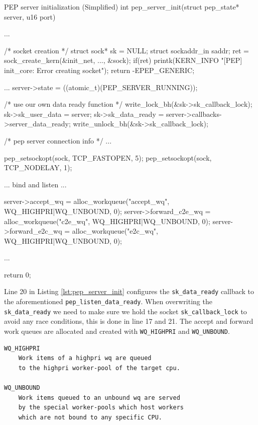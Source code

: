 \documentclass[a4paper,english, 11pt]{report}
\begin{document}
\begin{autonumlstlisting}[label=lst:pep_server_init]{PEP server initialization (Simplified)}
int pep_server_init(struct pep_state* server, u16 port)
{
	...

	/* socket creation */
	struct sock* sk = NULL;
	struct sockaddr_in saddr;
	ret = sock_create_kern(&init_net, ..., &sock);
	if(ret){
			printk(KERN_INFO "[PEP] init_core: Error creating socket\n");
			return -EPEP_GENERIC;
	}

	...
	server->state = ((atomic_t){(PEP_SERVER_RUNNING)});
	
	/* use our own data ready function */
	write_lock_bh(&sk->sk_callback_lock);
	sk->sk_user_data = server;
	sk->sk_data_ready = server->callbacks->server_data_ready;
	write_unlock_bh(&sk->sk_callback_lock);

	/* pep server connection info */
	...

	pep_setsockopt(sock, TCP_FASTOPEN, 5);
	pep_setsockopt(sock, TCP_NODELAY, 1);
	
	... bind and listen ...

	server->accept_wq = alloc_workqueue("accept_wq", WQ_HIGHPRI|WQ_UNBOUND, 0);
	server->forward_c2e_wq = alloc_workqueue("c2e_wq", WQ_HIGHPRI|WQ_UNBOUND, 0);
	server->forward_e2c_wq = alloc_workqueue("e2c_wq", WQ_HIGHPRI|WQ_UNBOUND, 0);

	...

	return 0;
}
\end{autonumlstlisting}

Line 20 in Listing \ref{lst:pep_server_init} configures the \verb|sk_data_ready| callback to the aforementioned \verb|pep_listen_data_ready|. When overwriting the \verb|sk_data_ready| we need to make sure we hold the socket \verb|sk_callback_lock| to avoid any race conditions, this is done in line 17 and 21. The accept and forward work queues are allocated and created with \verb|WQ_HIGHPRI| and \verb|WQ_UNBOUND|.\\

\noindent\begin{minipage}{\linewidth}
\begin{verbatim}
WQ_HIGHPRI
    Work items of a highpri wq are queued
    to the highpri worker-pool of the target cpu.

WQ_UNBOUND
    Work items queued to an unbound wq are served
    by the special worker-pools which host workers
    which are not bound to any specific CPU.
\end{verbatim}
\end{minipage}\\
\end{document}

